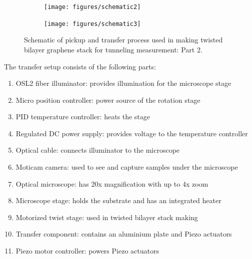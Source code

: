 \begin{figure}[H]
	\centering
	\begin{subfigure}{\linewidth}
		\centering
		\texttt{[image: figures/schematic2]}
	\end{subfigure}
	\begin{subfigure}{\linewidth}
		\centering
		\texttt{[image: figures/schematic3]}
	\end{subfigure}
	\caption{Schematic of pickup and transfer process used in making twisted bilayer graphene stack for tunneling measurement: Part 2.}
	\label{fig:schematic}
\end{figure}

The transfer setup consists of the following parts:
\begin{enumerate}
	\item OSL2 fiber illuminator: provides illumination for the microscope stage
	\item Micro position controller: power source of the rotation stage
	\item PID temperature controller: heats the stage
	\item Regulated DC power supply: provides voltage to the temperature controller
	\item Optical cable: connects illuminator to the microscope
	\item Moticam camera: used to see and capture samples under the microscope
	\item Optical microscope: has 20x magnification with up to 4x zoom
	\item Microscope stage: holds the substrate and has an integrated heater
	\item Motorized twist stage: used in twisted bilayer stack making
	\item Transfer component: contains an aluminium plate and Piezo actuators 
	\item Piezo motor controller: powers Piezo actuators
	
\end{enumerate}

